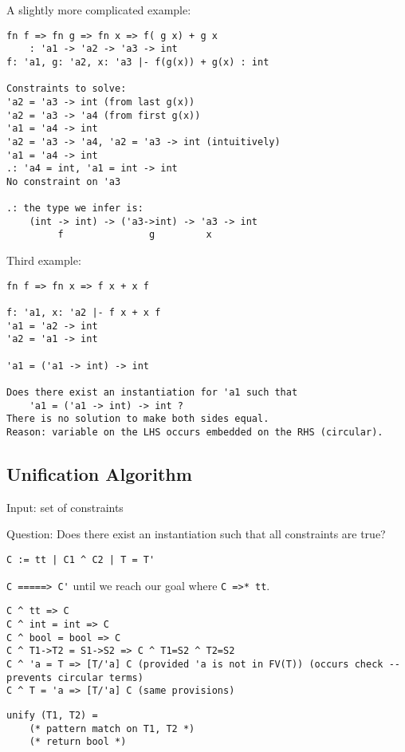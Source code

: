 \documentclass[11pt]{article}
\begin{document}
A slightly more complicated example:
\begin{verbatim}
fn f => fn g => fn x => f( g x) + g x
    : 'a1 -> 'a2 -> 'a3 -> int
f: 'a1, g: 'a2, x: 'a3 |- f(g(x)) + g(x) : int

Constraints to solve:
'a2 = 'a3 -> int (from last g(x))
'a2 = 'a3 -> 'a4 (from first g(x))
'a1 = 'a4 -> int
'a2 = 'a3 -> 'a4, 'a2 = 'a3 -> int (intuitively)
'a1 = 'a4 -> int
.: 'a4 = int, 'a1 = int -> int
No constraint on 'a3

.: the type we infer is:
    (int -> int) -> ('a3->int) -> 'a3 -> int
         f               g         x
\end{verbatim}

Third example:
\begin{verbatim}
fn f => fn x => f x + x f

f: 'a1, x: 'a2 |- f x + x f
'a1 = 'a2 -> int
'a2 = 'a1 -> int

'a1 = ('a1 -> int) -> int

Does there exist an instantiation for 'a1 such that
    'a1 = ('a1 -> int) -> int ?
There is no solution to make both sides equal.
Reason: variable on the LHS occurs embedded on the RHS (circular).
\end{verbatim}

\subsection{Unification Algorithm}
Input: set of constraints

Question: Does there exist an instantiation such that all constraints are true?

\verb~C := tt | C1 ^ C2 | T = T'~

\verb~C =====> C'~ until we reach our goal where \verb~C =>* tt~.

\begin{verbatim}
C ^ tt => C
C ^ int = int => C
C ^ bool = bool => C
C ^ T1->T2 = S1->S2 => C ^ T1=S2 ^ T2=S2
C ^ 'a = T => [T/'a] C (provided 'a is not in FV(T)) (occurs check -- prevents circular terms)
C ^ T = 'a => [T/'a] C (same provisions)
\end{verbatim}

\begin{verbatim}
unify (T1, T2) =
    (* pattern match on T1, T2 *)
    (* return bool *)
\end{verbatim}
\end{document}
